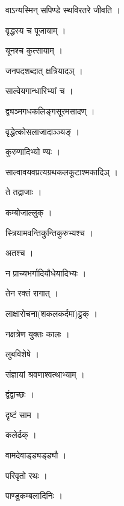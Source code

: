 \documentclass[10pt, openany]{book}
\begin{document}
\noindent वाऽन्यस्मिन् सपिण्डे स्थविरतरे जीवति ।

\noindent वृद्धस्य च पूजायाम् ।

\noindent यूनश्च कुत्सायाम् ।

\noindent जनपदशब्दात् क्षत्रियादञ् ।

\noindent साल्वेयगान्धारिभ्यां च ।

\noindent द्व्यञ्मगधकलिङ्गसूरमसादण् ।

\noindent वृद्धेत्कोसलाजादाञ्ञ्यङ् ।

\noindent कुरुणादिभ्यो ण्यः ।

\noindent साल्वावयवप्रत्यग्रथकलकूटाश्मकादिञ् ।

\noindent ते तद्राजाः ।

\noindent कम्बोजाल्लुक् ।

\noindent स्त्रियामवन्तिकुन्तिकुरुभ्यश्च ।

\noindent अतश्च ।

\noindent न प्राच्यभर्गादियौधेयादिभ्यः ।

\noindent तेन रक्तं रागात् ।

\noindent लाक्षारोचना(शकलकर्दमा)ट्ठक् ।

\noindent नक्षत्रेण युक्तः कालः ।

\noindent लुबविशेषे ।

\noindent संज्ञायां श्रवणाश्वत्थाभ्याम् ।

\noindent द्वंद्वाच्छः ।

\noindent दृष्टं साम ।

\noindent कलेर्ढक् ।

\noindent वामदेवाड्ड्यड्ड्यौ ।

\noindent परिवृतो रथः ।

\noindent पाण्डुकम्बलादिनिः ।
\end{document}
